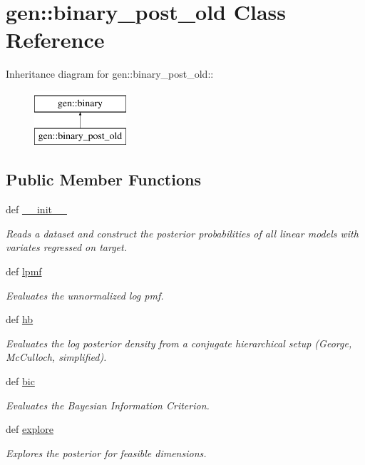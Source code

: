 \hypertarget{classgen_1_1binary__post__old}{
\section{gen::binary\_\-post\_\-old Class Reference}
\label{classgen_1_1binary__post__old}
}
Inheritance diagram for gen::binary\_\-post\_\-old::\begin{figure}[H]
\begin{center}
\leavevmode
\includegraphics[height=2cm]{classgen_1_1binary__post__old}
\end{center}
\end{figure}
\subsection*{Public Member Functions}
\begin{CompactItemize}
\item 
def \hyperlink{classgen_1_1binary__post__old_17a34493ef0f01b2fdc3fb1f0cdf7c27}{\_\-\_\-init\_\-\_\-}
\begin{CompactList}\small\item\em Reads a dataset and construct the posterior probabilities of all linear models with variates regressed on target. \item\end{CompactList}\item 
def \hyperlink{classgen_1_1binary__post__old_4a2b39c9d4d59a01f64f0f593f5034c3}{lpmf}
\begin{CompactList}\small\item\em Evaluates the unnormalized log pmf. \item\end{CompactList}\item 
def \hyperlink{classgen_1_1binary__post__old_023a5d03ed9651fb97b76c933b23663d}{hb}
\begin{CompactList}\small\item\em Evaluates the log posterior density from a conjugate hierarchical setup (George, McCulloch, simplified). \item\end{CompactList}\item 
def \hyperlink{classgen_1_1binary__post__old_9ff0bcd17b79b57d04fa262c34074ac7}{bic}
\begin{CompactList}\small\item\em Evaluates the Bayesian Information Criterion. \item\end{CompactList}\item 
def \hyperlink{classgen_1_1binary__post__old_4529d5812825affd59fabf1d87879584}{explore}
\begin{CompactList}\small\item\em Explores the posterior for feasible dimensions. \item\end{CompactList}\end{CompactItemize}
